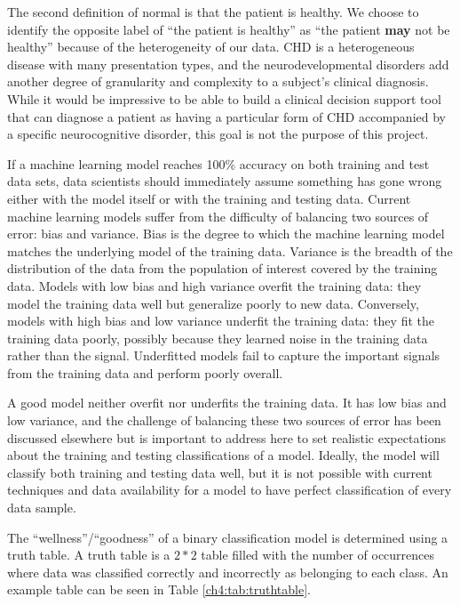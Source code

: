 The second definition of normal is that the patient is healthy. We choose to identify the opposite label of ``the patient is healthy'' as ``the patient \textbf{may} not be healthy'' because of the heterogeneity of our data. CHD is a heterogeneous disease with many presentation types, and the neurodevelopmental disorders add another degree of granularity and complexity to a subject's clinical diagnosis. While it would be impressive to be able to build a clinical decision support tool that can diagnose a patient as having a particular form of CHD accompanied by a specific neurocognitive disorder, this goal is not the purpose of this project.

If a machine learning model reaches 100\% accuracy on both training and test data sets, data scientists should immediately assume something has gone wrong either with the model itself or with the training and testing data. Current machine learning models suffer from the difficulty of balancing two sources of error: bias and variance. Bias is the degree to which the machine learning model matches the underlying model of the training data. Variance is the breadth of the distribution of the data from the population of interest covered by the training data. Models with low bias and high variance overfit the training data: they model the training data well but generalize poorly to new data. Conversely, models with high bias and low variance underfit the training data: they fit the training data poorly, possibly because they learned noise in the training data rather than the signal. Underfitted models fail to capture the important signals from the training data and perform poorly overall.

A good model neither overfit nor underfits the training data. It has low bias and low variance, and the challenge of balancing these two sources of error has been discussed elsewhere but is important to address here to set realistic expectations about the training and testing classifications of a model. Ideally, the model will classify both training and testing data well, but it is not possible with current techniques and data availability for a model to have perfect classification of every data sample. 

The ``wellness''/``goodness'' of a binary classification model is determined using a truth table. A truth table is a $2*2$ table filled with the number of occurrences where data was classified correctly and incorrectly as belonging to each class. An example table can be seen in Table \ref{ch4:tab:truthtable}.


